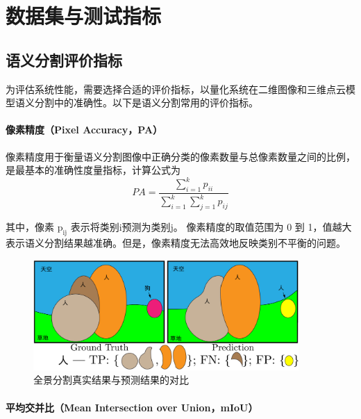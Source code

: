 \section{数据集与测试指标}

\subsection{语义分割评价指标}
\par 为评估系统性能，需要选择合适的评价指标，以量化系统在二维图像和三维点云模型语义分割中的准确性。以下是语义分割常用的评价指标。

\paragraph{像素精度（Pixel Accuracy，PA）}
\par 像素精度用于衡量语义分割图像中正确分类的像素数量与总像素数量之间的比例，是最基本的准确性度量指标，计算公式为
\begin{equation}
	PA=\frac{\sum_{i=1}^{k}p_{ii}}{\sum_{i=1}^{k}\sum_{j=1}^{k}p_{ij}}
	\label{pa}
\end{equation}

\par 其中，像素 $\text{p}_\text{ij}$ 表示将类别i预测为类别j。
像素精度的取值范围为 0 到 1，值越大表示语义分割结果越准确。但是，像素精度无法高效地反映类别不平衡的问题。

\begin{figure}[htb]
	\centering
	\includegraphics[width=0.9\textwidth]{figures/panoptic_seg_result.png}
	\caption{全景分割真实结果与预测结果的对比}
	\label{fig:panopticsegmentation_compare}
\end{figure}

\paragraph{平均交并比（Mean Intersection over Union，mIoU）}

